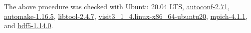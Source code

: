\documentclass{article}
\begin{document}
The above procedure was checked with Ubuntu 20.04 LTS, \href{https://ftp.gnu.org/gnu/autoconf/}{autoconf-2.71}, \href{https://ftp.gnu.org/gnu/automake/}{automake-1.16.5}, \href{https://mirrors.ocf.berkeley.edu/gnu/libtool/}{libtool-2.4.7}, \href{https://wci.llnl.gov/simulation/computer-codes/visit/executables}{visit3\_1\_4.linux-x86\_64-ubuntu20}, \href{https://www.mpich.org/downloads/}{mpich-4.1.1}, and \href{https://www.hdfgroup.org/downloads/hdf5/source-code/}{hdf5-1.14.0}.
\end{document}
